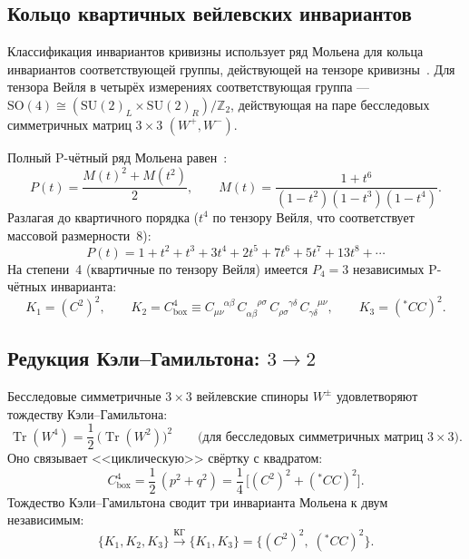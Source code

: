 \documentclass[12pt,a4paper]{article}
\theoremstyle{definition}
\theoremstyle{remark}
\newcommand{\Tr}{\operatorname{Tr}}
\begin{document}
\subsection{Кольцо квартичных вейлевских инвариантов}

Классификация инвариантов кривизны использует ряд Мольена для кольца
инвариантов соответствующей группы, действующей на тензоре
кривизны~\cite{Fulling:1992vm}.  Для тензора Вейля в четырёх измерениях
соответствующая группа ---
$\mathrm{SO}(4) \cong (\mathrm{SU}(2)_L \times \mathrm{SU}(2)_R)/\mathbb{Z}_2$,
действующая на паре бесследовых симметричных матриц $3 \times 3$
$(W^+, W^-)$.

Полный P-чётный ряд Мольена
равен~\cite{Fulling:1992vm}:
\begin{equation}\label{eq:molien}
  P(t) = \frac{M(t)^2 + M(t^2)}{2}, \qquad
  M(t) = \frac{1 + t^6}{(1-t^2)(1-t^3)(1-t^4)}.
\end{equation}
Разлагая до квартичного порядка ($t^4$ по тензору Вейля, что соответствует
массовой размерности~8):
\begin{equation}
  P(t) = 1 + t^2 + t^3 + 3t^4 + 2t^5 + 7t^6 + 5t^7 + 13t^8 + \cdots
\end{equation}
На степени~4 (квартичные по тензору Вейля) имеется $P_4 = 3$ независимых
P-чётных инварианта:
\begin{equation}\label{eq:three-invariants}
  K_1 = (C^2)^2, \qquad
  K_2 = C^4_{\mathrm{box}}
  \equiv C_{\mu\nu}^{\phantom{\mu\nu}\alpha\beta}\,
  C_{\alpha\beta}^{\phantom{\alpha\beta}\rho\sigma}\,
  C_{\rho\sigma}^{\phantom{\rho\sigma}\gamma\delta}\,
  C_{\gamma\delta}^{\phantom{\gamma\delta}\mu\nu}, \qquad
  K_3 = ({}^{\ast}\!CC)^2.
\end{equation}

\subsection{Редукция Кэли--Гамильтона: \texorpdfstring{$3 \to 2$}{3 -> 2}}

Бесследовые симметричные $3 \times 3$ вейлевские спиноры $W^\pm$
удовлетворяют тождеству Кэли--Гамильтона:
\begin{equation}\label{eq:CH}
  \Tr(W^4) = \frac{1}{2}\,\bigl(\Tr(W^2)\bigr)^2
  \qquad\text{(для бесследовых симметричных матриц $3 \times 3$)}.
\end{equation}
Оно связывает <<циклическую>> свёртку с квадратом:
\begin{equation}\label{eq:box-reduce}
  C^4_{\mathrm{box}} = \frac{1}{2}\,(p^2 + q^2)
  = \frac{1}{4}\,\bigl[(C^2)^2 + ({}^{\ast}\!CC)^2\bigr].
\end{equation}
Тождество Кэли--Гамильтона сводит три инварианта Мольена к двум
независимым:
\begin{equation}
  \{K_1, K_2, K_3\}
  \xrightarrow{\text{КГ}} \{K_1, K_3\}
  = \{(C^2)^2,\; ({}^{\ast}\!CC)^2\}.
\end{equation}
\end{document}
